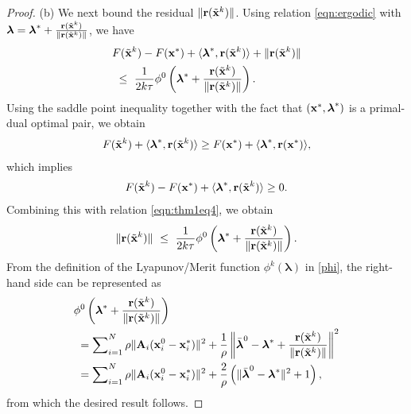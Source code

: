 \documentclass[doublecolumn]{IEEEtran}
\begin{document}
\begin{proof}
\noindent (b)
We next bound the residual $\|{ {\bf r} }( { \tilde{\bf x} }^k  )\|$.
Using relation \eqref{eqn:ergodic} with ${\boldsymbol{\lambda}} = {\boldsymbol{\lambda}}^* + \frac{{ {\bf r} }( { \tilde{\bf x} }^k  )}{\|{ {\bf r} }( { \tilde{\bf x} }^k  )\|}$, we have
\begin{align}\label{eqn:thm1eq4}
& F( { \tilde{\bf x} }^k  ) - F({ {\bf x} }^*) + \langle {\boldsymbol{\lambda}}^*, { {\bf r} }( { \tilde{\bf x} }^k  )\rangle  + \|{ {\bf r} }( { \tilde{\bf x} }^k  )\|\nonumber\\
& ~\leq~ \frac{1}{2k\tau}   \phi^0\left({\boldsymbol{\lambda}}^* + \frac{{ {\bf r} }( { \tilde{\bf x} }^k  )}{\|{ {\bf r} }( { \tilde{\bf x} }^k  )\|}\right).
\end{align}
Using the saddle point inequality together with the fact that $({ {\bf x} }^*,{\boldsymbol{\lambda}}^*)$ is a primal-dual optimal pair,
we obtain
\begin{align*}
F( { \tilde{\bf x} }^k  ) + \langle {\boldsymbol{\lambda}}^*, { {\bf r} }( { \tilde{\bf x} }^k  )\rangle \ge F({ {\bf x} }^*) + \langle {\boldsymbol{\lambda}}^*, { {\bf r} }( { {\bf x} }^*  )\rangle,
\end{align*}
which implies
\begin{align*}
F( { \tilde{\bf x} }^k  ) -F({ {\bf x} }^*) +  \langle {\boldsymbol{\lambda}}^*, { {\bf r} }( { \tilde{\bf x} }^k  )\rangle \ge 0.
\end{align*}
Combining this with relation \eqref{eqn:thm1eq4}, we obtain
\begin{align*}
\|{ {\bf r} }( { \tilde{\bf x} }^k  )\|
 ~\leq~ \frac{1}{2k\tau}   \phi^0\left({\boldsymbol{\lambda}}^* + \frac{{ {\bf r} }( { \tilde{\bf x} }^k  )}{\|{ {\bf r} }( { \tilde{\bf x} }^k  )\|}\right).
\end{align*}
From the definition of the Lyapunov/Merit function $\phi^k({\boldsymbol{\lambda}})$ in \eqref{phi},
the right-hand side can be represented as
\begin{align*}
&\phi^0\left({\boldsymbol{\lambda}}^* + \frac{{ {\bf r} }( { \tilde{\bf x} }^k  )}{\|{ {\bf r} }( { \tilde{\bf x} }^k  )\|}\right) \\
&~ = \sum\nolimits_{i=1}^N {\rho}\|{ {\bf A} }_i({ {\bf x} }_i^0-{ {\bf x} }_i^*)\|^2 +\frac{1}{\rho}\left\|\bar{\boldsymbol{\lambda}}^0-{\boldsymbol{\lambda}}^* + \frac{{ {\bf r} }( { \tilde{\bf x} }^k  )}{\|{ {\bf r} }( { \tilde{\bf x} }^k  )\|}\right\|^2\\
&~ = \sum\nolimits_{i=1}^N {\rho}\|{ {\bf A} }_i({ {\bf x} }_i^0-{ {\bf x} }_i^*)\|^2 +\frac{2}{\rho}\left(\|\bar{\boldsymbol{\lambda}}^0-{\boldsymbol{\lambda}}^*\|^2 + 1\right),
\end{align*}
from which the desired result follows.

\end{proof}
\end{document}
